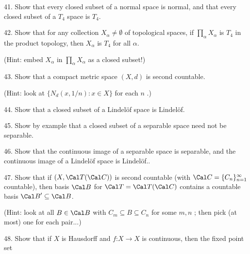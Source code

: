 \ssk

\item{41.} Show that every closed subset of a normal space is normal, and that every 
closed subset of a $T_4$ space is $T_4$.

\ssk

\item{42.} Show that for any collection $X_\alpha\neq \emptyset$ of topological spaces, if 
$\displaystyle\prod_\alpha X_\alpha$ is $T_4$ in the product topology, then $X_\alpha$ is 
$T_4$ for all $\alpha$.

\ssk

\item{} (Hint: embed $X_\alpha$ in $\displaystyle\prod_\alpha X_\alpha$ as a closed subset!)

\ssk

\item{43.} Show that a compact metric space $(X,d)$ is second countable.

\ssk

\item{} (Hint: look at $\{ N_d(x,1/n) : x\in X\}$ for each $n$ .)

\ssk

\item{44.} Show that a closed subset of a Lindel\"of space is Lindel\"of.

\ssk

\item{45.} Show by example that a closed subset of a separable space 
need not be separable.

\ssk

\item{46.} Show  that the continuous image of a separable space 
is separable, and the continuous image of a Lindel\"of space is Lindel\"of..

\ssk

\item{47.} Show that if $(X,{\Cal T}({\Cal C}))$ is second countable 
(with ${\Cal C} = \{ C_n\}_{n=1}^\infty$ 
countable), then 
basis ${\Cal B}$ for ${\Cal T} = {\Cal T}({\Cal C})$
contains a countable basis ${\Cal B}^\prime\subseteq{\Cal B}$.

\ssk

\item{} (Hint: look at all $B\in{\Cal B}$ with $C_m\subseteq B\subseteq C_n$ for some $m,n$ ;  then pick (at most) one for each pair...)

\ssk

\item{48.} Show that if $X$ is Hausdorff and 
$f$:$X\rightarrow X$ is continuous, then the fixed 
point set 

